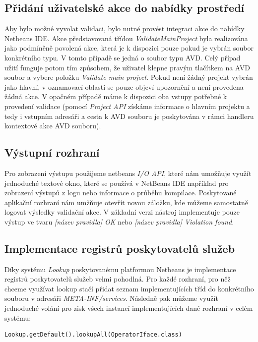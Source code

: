 \subsection{Přidání uživatelské akce do nabídky prostředí}
Aby bylo možné vyvolat validaci, bylo nutné provést integraci akce do nabídky Netbeans IDE. Akce představovaná třídou \emph{ValidateMainProject} byla realizována jako podmíněně povolená akce, která je k dispozici pouze pokud je vybrán soubor konkrétního typu. V tomto případě se jedná o soubor typu AVD. Celý případ užití funguje potom tím způsobem, že uživatel klepne pravým tlačítkem na AVD soubor a vybere položku \emph{Validate main project}. Pokud není žádný projekt vybrán jako hlavní, v oznamovací oblasti se pouze objeví upozornění a není provedena žádná akce. V opačném případě máme k dispozici oba vstupy potřebné k provedení validace (pomocí \emph{Project API} získáme informace o hlavním projektu a tedy i vstupním adresáři a cesta k AVD souboru je poskytována v rámci handleru kontextové akce AVD souboru).

\subsection{Výstupní rozhraní}
Pro zobrazení výstupu použijeme netbeans \emph{I/O API}, které nám umožňuje využít jednoduché textové okno, které se používá v NetBeans IDE například pro zobrazení výstupů z logu nebo informace o průběhu kompilace. Poskytované aplikační rozhraní nám umžňuje otevřít novou záložku, kde můžeme samostatně logovat výsledky validační akce. V základní verzi nástroj implementuje pouze výstup ve tvaru \emph{[název pravidla] OK} nebo \emph{[název pravidla] Violation found.}

\subsection{Implementace registrů poskytovatelů služeb}
Díky systému \emph{Lookup} poskytovanému platformou Netbeans je implementace registrů poskytovatelů služeb velmi pohodlná. Pro každé rozhraní, pro něž chceme využívat lookup stačí přidat seznam implementujících tříd do konkrétního souboru v adresáři \emph{META-INF/services}. Následně pak můžeme využít jednoduché volání pro zisk všech instancí implementujících dané rozhraní v celém systému:

\begin{verbatim}
Lookup.getDefault().lookupAll(OperatorIface.class)
\end{verbatim}

